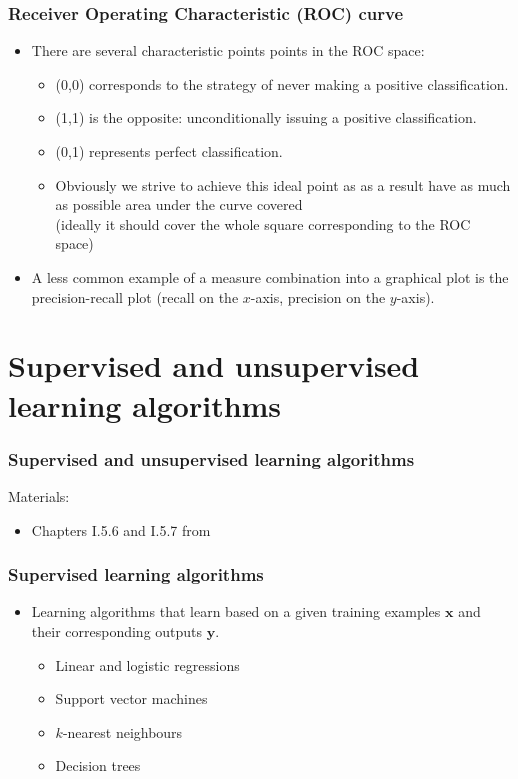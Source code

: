 \documentclass[notes]{beamer}          %
\newcommand{\vect}[1]{\bm{#1}}
\newif\iffull
\begin{document}
\begin{frame}
\frametitle{Receiver Operating Characteristic (ROC) curve}
    \begin{itemize}
        \item  There are several characteristic points points in the ROC space:
            \begin{itemize}
                \item (0,0) corresponds to the strategy of never making a positive classification.
                \item (1,1) is the opposite: unconditionally issuing a positive classification.
                \item (0,1) represents perfect classification.
                \item Obviously we strive to achieve this ideal point as as a result have as much as possible area under the curve covered \\
                (ideally it should cover the whole square corresponding to the ROC space)
            \end{itemize}
        \item  A less common example of a measure combination into a graphical plot is the precision-recall plot (recall on the $x$-axis, precision on the $y$-axis).
    \end{itemize}
\end{frame}

\fi %

\iffull %

\section{Supervised and unsupervised learning algorithms}

\begin{frame}
\frametitle{Supervised and unsupervised learning algorithms}
Materials:
\begin{itemize}
    \item Chapters I.5.6 and I.5.7 from \cite{deeplearning}
\end{itemize}
\end{frame}

\begin{frame}
\frametitle{Supervised learning algorithms}
    \begin{itemize}
        \item Learning algorithms that learn based on a given training examples $\vect{x}$ and their corresponding outputs $\vect{y}$.
        \begin{itemize}
            \item Linear and logistic regressions
            \item Support vector machines
            \item $k$-nearest neighbours
            \item Decision trees
        \end{itemize}
    \end{itemize}
\end{frame}
\end{document}
